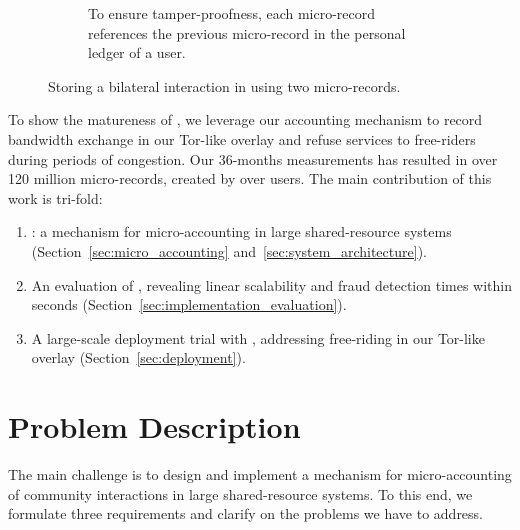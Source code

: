 \begin{figure}[t!]
\begin{subfigure}[t]{.33\textwidth}
		\caption{To ensure tamper-proofness, each micro-record references the previous micro-record in the personal ledger of a user.}
		\label{fig:trustchain_tutorial_3}
	\end{subfigure}
	\caption{Storing a bilateral interaction in \ModelName{} using two micro-records.}
	\label{fig:trustchain_tutorial}
\end{figure}

To show the matureness of \ModelName{}, we leverage our accounting mechanism to record bandwidth exchange in our Tor-like overlay and refuse services to free-riders during periods of congestion.
Our 36-months measurements has resulted in over 120 million micro-records, created by over \TrialUsers{} users.
The main contribution of this work is tri-fold:
\begin{enumerate}
	\item \ModelName: a mechanism for micro-accounting in large shared-resource systems (Section~\ref{sec:micro_accounting} and~\ref{sec:system_architecture}).
	\item An evaluation of \ModelName{}, revealing linear scalability and fraud detection times within seconds (Section~\ref{sec:implementation_evaluation}).
	\item A large-scale deployment trial with \ModelName, addressing free-riding in our Tor-like overlay (Section~\ref{sec:deployment}).
\end{enumerate}



\section{Problem Description}
The main challenge is to design and implement a mechanism for micro-accounting of community interactions in large shared-resource systems.
To this end, we formulate three requirements and clarify on the problems we have to address.

